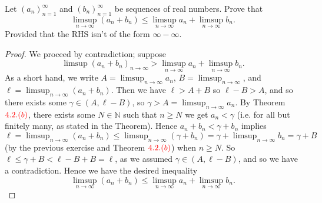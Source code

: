\documentclass[oneside]{amsart}
\theoremstyle{definition}
\newcommand{\nn}{\mathbb N}
\begin{document}
\begin{tcolorbox}[colback=black!5!white,colframe=black!75!black,title= Exercise $4.2.$]  Let $(a_n)_{n=1}^\infty$ and $(b_n)^\infty_{n=1}$ be sequences of real numbers. Prove that $$ \limsup _{n \to \infty} (a_n+b_n) \leq \limsup _{n \to \infty} a_n + \limsup _{n \to \infty} b_n. $$ Provided that the RHS isn't of the form $\infty - \infty$. 
\tcblower 
\begin{proof} We proceed by contradiction; suppose $$\limsup (a_n+ b_n) _{n \to \infty} > \limsup _{n \to \infty} a_n + \limsup _{n \to \infty} b_n.$$ As a short hand, we write $A = \limsup_{n \to \infty} a_n$, $B = \limsup  _{n \to \infty}$, and \\ $\ell = \limsup_{n \to \infty} (a_n +b_n)$. Then we have $\ell > A+B$ so $\ell -B>A$, and so there exists some $\gamma \in (A, \ell - B)$, so $ \gamma >A = \limsup_{n\to \infty} a_n$. By Theorem $\textcolor{red}{4.2.(b)}$, there exists some $N \in \nn$ such that $n \geq N $ we get $a_n < \gamma$ (i.e. for all but finitely many, as stated in the Theorem). Hence $a_n + b_n < \gamma + b_n$ implies $ \ell = \limsup _{n \to \infty} (a_n+b_n) \leq \limsup_{n\to \infty} (\gamma + b_n) = \gamma + \limsup_{n \to \infty} b_n = \gamma + B$ (by the previous exercise and Theorem $\textcolor{red}{4.2.(b)}$) when $n \geq N$. So $\ell \leq  \gamma + B <\ell - B + B = \ell $, as we assumed $\gamma \in (A, \ell -B)$, and so we have a contradiction. Hence we have the desired inequality $$ \limsup _{n \to \infty} (a_n+b_n) \leq \limsup _{n \to \infty} a_n + \limsup _{n \to \infty} b_n. $$
\end{proof}
\end{tcolorbox}
\end{document}
